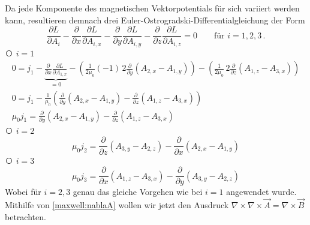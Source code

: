 Da jede Komponente des magnetischen Vektorpotentials für sich variiert werden kann, resultieren demnach drei Euler-Ostrogradski-Differentialgleichung der Form
\[ 
\frac{\partial L}{\partial A_i} 
- \frac{\partial}{\partial x}\frac{\partial L}{\partial A_{i,x}}
- \frac{\partial}{\partial y}\frac{\partial L}{\partial A_{i,y}}
- \frac{\partial}{\partial z}\frac{\partial L}{\partial A_{i,z}}
= 0 \qquad \text{für } i=1,2,3
\, . \]
{\larger\textcircled{}} $i = 1$
\begin{subequations}
	\label{maxwell:magnetoL1}
\begin{gather}
	0
	=
	j_1 - \underbrace{\frac{\partial}{\partial x}\frac{\partial L}{\partial A_{1,x}}}_{=0}
	 - \left( \frac{1}{2\mu_0}(-1)\,2 \frac{\partial}{\partial y}(A_{2,x}-A_{1,y})\right) 
	 - \left( \frac{1}{2\mu_0}\,2\frac{\partial}{\partial z}(A_{1,z}-A_{3,x})\right)
	 \\
	 0
	 =
	 j_1 - \frac{1}{\mu_0}\left( \frac{\partial}{\partial y}(A_{2,x}-A_{1,y})
	 - \frac{\partial}{\partial z}(A_{1,z}-A_{3,x})
	 \right)  
	 \\	 
	 \mu_0j_1
	 =
	 \frac{\partial}{\partial y}(A_{2,x}-A_{1,y})
	 - \frac{\partial}{\partial z}(A_{1,z}-A_{3,x})	 	 	 
\end{gather}
\end{subequations}
{\larger\textcircled{}} $i = 2$
\begin{equation}
	\label{maxwell:magnetoL2}
	\mu_0j_2
	=
	\frac{\partial}{\partial z}(A_{3,y}-A_{2,z})
	- \frac{\partial}{\partial x}(A_{2,x}-A_{1,y})
\end{equation}
{\larger\textcircled{}} $i = 3$
\begin{equation}
	\label{maxwell:magnetoL3}
	\mu_0j_3
	=
	\frac{\partial}{\partial x}(A_{1,z}-A_{3,x})
	- \frac{\partial}{\partial y}(A_{3,y}-A_{2,z})
\end{equation}
Wobei für $i=2,3$ genau das gleiche Vorgehen wie bei $i=1$ angewendet wurde.
Mithilfe von \ref{maxwell:nablaA} wollen wir jetzt den Ausdruck $\nabla\times\nabla\times\vec{A} = \nabla\times\vec{B}$ betrachten.

